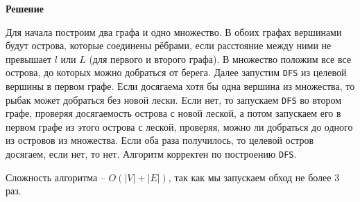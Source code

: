 \documentclass{article}
\begin{document}
\medskip

\textbf{Решение}

\medskip

Для начала построим два графа и одно множество. В обоих графах
вершинами будут острова, которые соединены рёбрами, если расстояние
между ними не превышает $l$ или $L$ (для первого и второго графа).
В множество положим все все острова, до которых можно добраться от берега.
Далее запустим \texttt{DFS} из целевой вершины в первом графе. Если
досягаема хотя бы одна вершина из множества, то рыбак может добраться
без новой лески. Если нет, то запускаем \texttt{DFS} во втором графе,
проверяя досягаемость острова с новой леской, а потом запускаем его
в первом графе из этого острова с леской, проверяя, можно ли добраться
до одного из островов из множества. Если оба раза получилось, то целевой
остров досягаем, если нет, то нет. Алгоритм корректен по построению
\texttt{DFS}.

Сложность алгоритма -- $O(|V| + |E|)$, так как мы запускаем обход не
более 3 раз.
\end{document}
